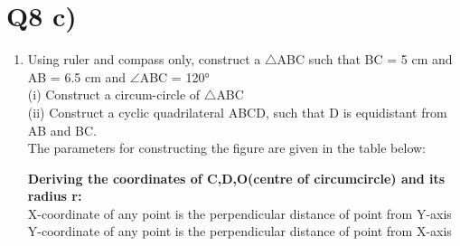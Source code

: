 \documentclass[journal,12pt,twocolumn]{IEEEtran}
\renewcommand\thesection{\arabic{section}}
\begin{document}
\section{Q8 c)}
\begin{enumerate}[label=\thesection.\arabic*.,ref=\thesection.\theenumi]
\item Using ruler and compass only, construct a $\bigtriangleup$ABC such that BC = 5 cm
and AB = 6.5 cm and $\angle$ABC = 120°\\
(i) Construct a circum-circle of $\bigtriangleup$ABC\\
(ii) Construct a cyclic quadrilateral ABCD, such that D is equidistant from AB and BC.\\

\solution The parameters for constructing the figure are given in the table below:

\begin{table}[h]
\centering
\caption{}
 	
\end{table}

\textbf{Deriving the coordinates of C,D,O(centre of circumcircle) and its radius r:}\\

X-coordinate of any point is the perpendicular distance of point from Y-axis\\
Y-coordinate of any point is the perpendicular distance of point from X-axis\\


\end{enumerate}
\end{document}

